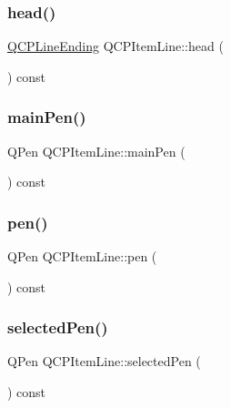 \subsubsection{\texorpdfstring{head()}{head()}}
{\footnotesize\ttfamily \hyperlink{class_q_c_p_line_ending}{Q\+C\+P\+Line\+Ending} Q\+C\+P\+Item\+Line\+::head (\begin{DoxyParamCaption}{ }\end{DoxyParamCaption}) const\hspace{0.3cm}{\ttfamily [inline]}}

\mbox{\label{class_q_c_p_item_line_af8b5370462515b279578d8b4a57bd3b4}} 
\subsubsection{\texorpdfstring{main\+Pen()}{mainPen()}}
{\footnotesize\ttfamily Q\+Pen Q\+C\+P\+Item\+Line\+::main\+Pen (\begin{DoxyParamCaption}{ }\end{DoxyParamCaption}) const\hspace{0.3cm}{\ttfamily [protected]}}

\mbox{\label{class_q_c_p_item_line_a712e5a7f59db3f4c588dfc370a63e225}} 
\subsubsection{\texorpdfstring{pen()}{pen()}}
{\footnotesize\ttfamily Q\+Pen Q\+C\+P\+Item\+Line\+::pen (\begin{DoxyParamCaption}{ }\end{DoxyParamCaption}) const\hspace{0.3cm}{\ttfamily [inline]}}

\mbox{\label{class_q_c_p_item_line_ae1782c4fbecd38054ec3d49d8572a5e5}} 
\subsubsection{\texorpdfstring{selected\+Pen()}{selectedPen()}}
{\footnotesize\ttfamily Q\+Pen Q\+C\+P\+Item\+Line\+::selected\+Pen (\begin{DoxyParamCaption}{ }\end{DoxyParamCaption}) const\hspace{0.3cm}{\ttfamily [inline]}}

